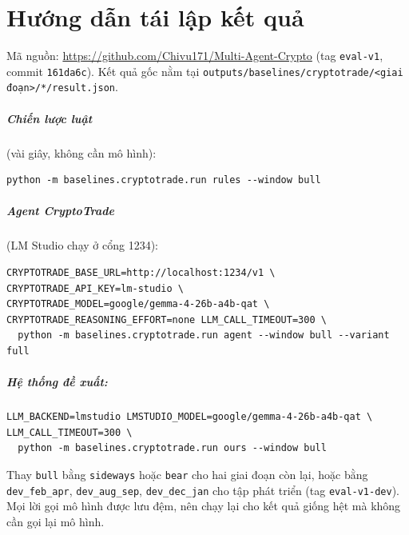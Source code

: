 \chapter{Hướng dẫn tái lập kết quả}
\label{app:repro}

Mã nguồn: \url{https://github.com/Chivu171/Multi-Agent-Crypto} (tag \texttt{eval-v1}, commit \texttt{161da6c}).
Kết quả gốc nằm tại \texttt{outputs/baselines/cryptotrade/<giai đoạn>/*/result.json}.

\paragraph{Chiến lược luật} (vài giây, không cần mô hình):
\begin{Verbatim}
python -m baselines.cryptotrade.run rules --window bull
\end{Verbatim}

\paragraph{Agent CryptoTrade} (LM Studio chạy ở cổng 1234):
\begin{Verbatim}
CRYPTOTRADE_BASE_URL=http://localhost:1234/v1 \
CRYPTOTRADE_API_KEY=lm-studio \
CRYPTOTRADE_MODEL=google/gemma-4-26b-a4b-qat \
CRYPTOTRADE_REASONING_EFFORT=none LLM_CALL_TIMEOUT=300 \
  python -m baselines.cryptotrade.run agent --window bull --variant full
\end{Verbatim}

\paragraph{Hệ thống đề xuất:}
\begin{Verbatim}
LLM_BACKEND=lmstudio LMSTUDIO_MODEL=google/gemma-4-26b-a4b-qat \
LLM_CALL_TIMEOUT=300 \
  python -m baselines.cryptotrade.run ours --window bull
\end{Verbatim}

Thay \texttt{bull} bằng \texttt{sideways} hoặc \texttt{bear} cho hai giai đoạn còn lại, hoặc bằng
\texttt{dev\_feb\_apr}, \texttt{dev\_aug\_sep}, \texttt{dev\_dec\_jan} cho tập phát triển (tag \texttt{eval-v1-dev}). Mọi
lời gọi mô hình được lưu đệm, nên chạy lại cho kết quả giống hệt mà không cần gọi lại mô hình.

